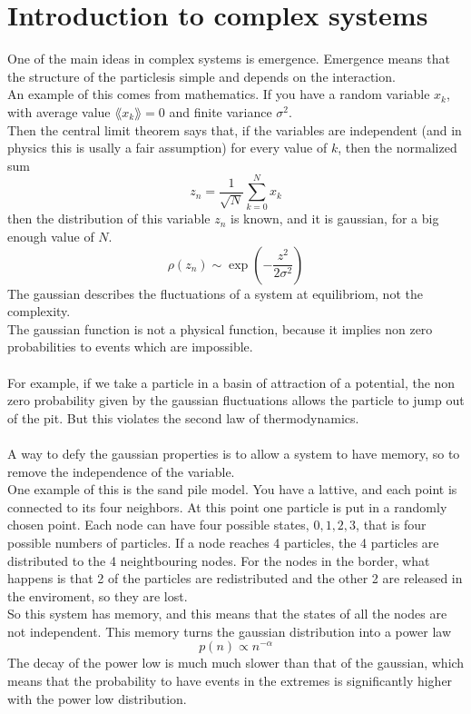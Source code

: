\section{Introduction to complex systems}
One of the main ideas in complex systems is emergence. Emergence means that the structure of the particlesis simple and depends on the interaction. \\
An example of this comes from mathematics. 
If you have a random variable $x_k$, with average value $\lang x_k \rang = 0$ and finite variance $\sigma^2$. \\
Then the central limit theorem says that, if the variables are independent (and in physics this is usally a fair assumption) for every value of $k$, then the normalized sum 
$$
	z_n = \frac{1}{\sqrt{N}}\sum_{k=0}^N x_k
$$
then the distribution of this variable $z_n$ is known, and it is gaussian, for a big enough value of $N$.
$$
	\rho(z_n) \sim \exp\left(-\frac{z^2}{2\sigma^2}\right)
$$
The gaussian describes the fluctuations of a system at equilibriom, not the complexity. \\
The gaussian function is not a physical function, because it implies non zero probabilities to events which are impossible. \\ \\
For example, if we take a particle in a basin of attraction of a potential, the non zero probability given by the gaussian fluctuations allows the particle to jump out of the pit. But this violates the second law of thermodynamics. \\ \\
A way to defy the gaussian properties is to allow a system to have memory, so to remove the independence of the variable. \\
One example of this is the sand pile model. You have a lattive, and each point is connected to its four neighbors. At this point one particle is put in a randomly chosen point. Each node can have four possible states, $0,1,2,3$, that is four possible numbers of particles. If a node reaches 4 particles, the 4 particles are distributed to the 4 neightbouring nodes. For the nodes in the border, what happens is that 2 of the particles are redistributed and the other 2 are released in the enviroment, so they are lost. \\
So this system has memory, and this means that the states of all the nodes are not independent. This memory turns the gaussian distribution into a power law
$$
	p(n) \propto n^{-\alpha}
$$
The decay of the power low is much much slower than that of the gaussian, which means that the probability to have events in the extremes is significantly higher with the power low distribution.
